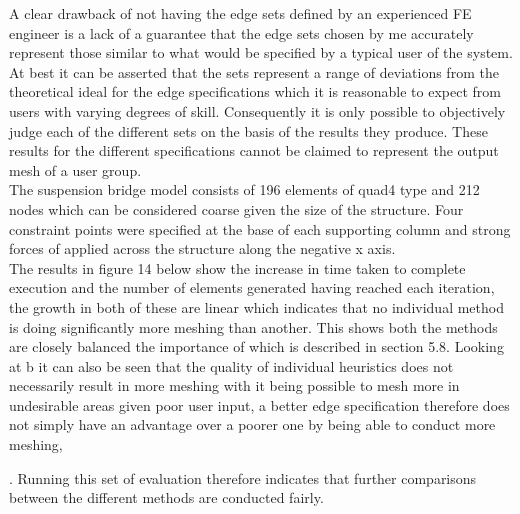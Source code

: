 \noindent
A clear drawback of not having the edge sets defined by an experienced FE engineer is a lack of a guarantee that the edge sets chosen by me accurately represent those similar to what would be specified by a typical user of the system. At best it can be asserted that the sets represent a range of deviations from the theoretical ideal for the edge specifications which it is reasonable to expect from users with varying degrees of skill. Consequently it is only possible to objectively judge each of the different sets on the basis of the results they produce. These results for the different specifications cannot be claimed to represent the output mesh of a user group.\\ 

\noindent
The suspension bridge model consists of 196 elements of quad4 type and 212 nodes which can be considered coarse given the size of the structure. Four constraint points were specified at the base of each supporting column and strong forces of applied across the structure along the negative x axis. \\

\noindent
The results in figure 14 below show the increase in time taken to complete execution and the number of elements generated having reached each iteration, the growth in both of these are linear which indicates that no individual method is doing significantly more meshing than another. This shows both the methods are closely balanced the importance of which is described in section 5.8. Looking at b it can also be seen that the quality of individual heuristics does not necessarily result in more meshing with it being possible to mesh more in undesirable areas given poor user input, a better edge specification  therefore does not simply have an advantage over a poorer one by being able to conduct more meshing, 

. Running this set of evaluation therefore indicates that further comparisons between the different methods are conducted fairly. \\


